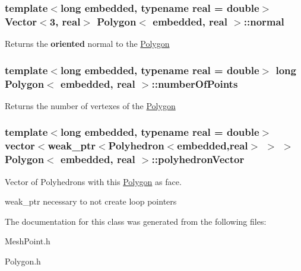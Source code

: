 \subsubsection[{\texorpdfstring{normal}{normal}}]{\setlength{\rightskip}{0pt plus 5cm}template$<$long embedded, typename real = double$>$ {\bf Vector}$<$3, real$>$ {\bf Polygon}$<$ embedded, real $>$\+::normal\hspace{0.3cm}{\ttfamily [protected]}}\hypertarget{class_polygon_a23acd35ab3af1494250f68fe733f2a1c}{}\label{class_polygon_a23acd35ab3af1494250f68fe733f2a1c}
\begin{DoxyReturn}{Returns}
the {\bfseries oriented} normal to the \hyperlink{class_polygon}{Polygon} 
\end{DoxyReturn}
\subsubsection[{\texorpdfstring{number\+Of\+Points}{numberOfPoints}}]{\setlength{\rightskip}{0pt plus 5cm}template$<$long embedded, typename real = double$>$ long {\bf Polygon}$<$ embedded, real $>$\+::number\+Of\+Points}\hypertarget{class_polygon_a84d5ff2931fc01477beb2acc4c7448fb}{}\label{class_polygon_a84d5ff2931fc01477beb2acc4c7448fb}
\begin{DoxyReturn}{Returns}
the number of vertexes of the \hyperlink{class_polygon}{Polygon} 
\end{DoxyReturn}
\subsubsection[{\texorpdfstring{polyhedron\+Vector}{polyhedronVector}}]{\setlength{\rightskip}{0pt plus 5cm}template$<$long embedded, typename real = double$>$ vector$<$weak\+\_\+ptr$<${\bf Polyhedron}$<$embedded,real$>$ $>$ $>$ {\bf Polygon}$<$ embedded, real $>$\+::polyhedron\+Vector\hspace{0.3cm}{\ttfamily [protected]}}\hypertarget{class_polygon_aac6777656621ccf17a4a6f144000cd56}{}\label{class_polygon_aac6777656621ccf17a4a6f144000cd56}


Vector of Polyhedrons with this \hyperlink{class_polygon}{Polygon} as face. 

weak\+\_\+ptr necessary to not create loop pointers 

The documentation for this class was generated from the following files\+:\begin{DoxyCompactItemize}
\item 
Mesh\+Point.\+h\item 
Polygon.\+h\end{DoxyCompactItemize}
